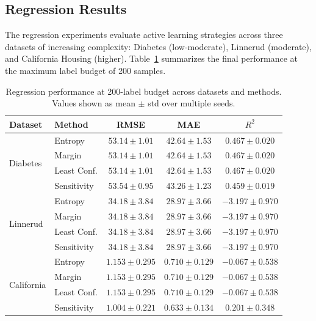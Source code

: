 \documentclass[conference]{IEEEtran}
\begin{document}
\subsection{Regression Results}

The regression experiments evaluate active learning strategies across three datasets of increasing complexity: Diabetes (low-moderate), Linnerud (moderate), and California Housing (higher). Table~\ref{tab:reg-results} summarizes the final performance at the maximum label budget of 200 samples.

\begin{table}[t]
\centering
\caption{Regression performance at 200-label budget across datasets and methods. Values shown as mean $\pm$ std over multiple seeds.}
\label{tab:reg-results}
\begin{tabular}{llccc}
\toprule
Dataset & Method & RMSE & MAE & $R^2$ \\
\midrule
\multirow{4}{*}{Diabetes} & Entropy & $53.14 \pm 1.01$ & $42.64 \pm 1.53$ & $0.467 \pm 0.020$ \\
 & Margin & $53.14 \pm 1.01$ & $42.64 \pm 1.53$ & $0.467 \pm 0.020$ \\
 & Least Conf. & $53.14 \pm 1.01$ & $42.64 \pm 1.53$ & $0.467 \pm 0.020$ \\
 & Sensitivity & $53.54 \pm 0.95$ & $43.26 \pm 1.23$ & $0.459 \pm 0.019$ \\
\midrule
\multirow{4}{*}{Linnerud} & Entropy & $34.18 \pm 3.84$ & $28.97 \pm 3.66$ & $-3.197 \pm 0.970$ \\
 & Margin & $34.18 \pm 3.84$ & $28.97 \pm 3.66$ & $-3.197 \pm 0.970$ \\
 & Least Conf. & $34.18 \pm 3.84$ & $28.97 \pm 3.66$ & $-3.197 \pm 0.970$ \\
 & Sensitivity & $34.18 \pm 3.84$ & $28.97 \pm 3.66$ & $-3.197 \pm 0.970$ \\
\midrule
\multirow{4}{*}{California} & Entropy & $1.153 \pm 0.295$ & $0.710 \pm 0.129$ & $-0.067 \pm 0.538$ \\
 & Margin & $1.153 \pm 0.295$ & $0.710 \pm 0.129$ & $-0.067 \pm 0.538$ \\
 & Least Conf. & $1.153 \pm 0.295$ & $0.710 \pm 0.129$ & $-0.067 \pm 0.538$ \\
 & Sensitivity & $\mathbf{1.004 \pm 0.221}$ & $\mathbf{0.633 \pm 0.134}$ & $\mathbf{0.201 \pm 0.348}$ \\
\bottomrule
\end{tabular}
\end{table}
\end{document}
